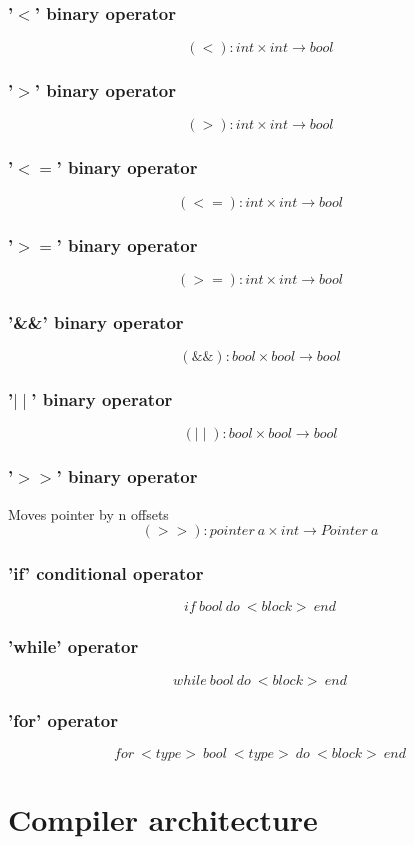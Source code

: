 \documentclass{article}
\begin{document}
\subsubsection{'$<$' binary operator}
$$
(<): int \times int \longrightarrow bool
$$

\subsubsection{'$>$' binary operator}
$$
(>): int \times int \longrightarrow bool
$$
\subsubsection{'$<=$' binary operator}
$$
(<=): int \times int \longrightarrow bool
$$
\subsubsection{'$>=$' binary operator}
$$
(>=): int \times int \longrightarrow bool
$$
\subsubsection{'\&\&' binary operator}
$$
(\&\&): bool \times bool \longrightarrow bool
$$
\subsubsection{'$\mid\mid$' binary operator}
$$
(\mid\mid): bool \times bool \longrightarrow bool
$$
\subsubsection{'$>>$' binary operator}
Moves pointer by n offsets
$$
(>>): pointer \ a \times int \longrightarrow Pointer \ a
$$
\subsubsection{'if' conditional operator}
$$
if \ bool \ do \ <block> \ end
$$
\subsubsection{'while' operator}
$$
while \ bool \ do \ <block> \ end
$$
\subsubsection{'for' operator}
$$
for \ <type> \ bool \ <type> \ do \ <block> \ end
$$

\section{Compiler architecture}
\end{document}

